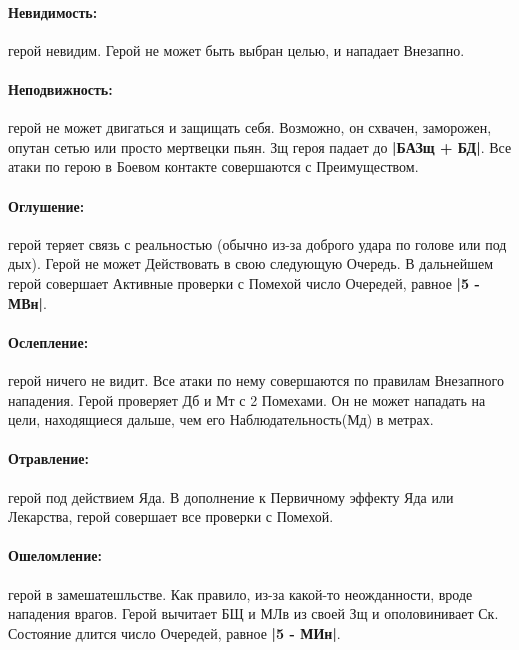\paragraph{Невидимость:} герой невидим. Герой не может быть выбран целью, и нападает Внезапно.
\paragraph{Неподвижность:} герой не может двигаться и защищать себя. Возможно, он схвачен, заморожен, опутан сетью или просто мертвецки пьян. Зщ героя падает до \textbf{|БАЗщ + БД|}. Все атаки по герою в Боевом контакте совершаются с Преимуществом. 
\paragraph{Оглушение:} герой теряет связь с реальностью (обычно из-за доброго удара по голове или под дых). Герой не может Действовать в свою следующую Очередь. В дальнейшем герой совершает Активные проверки с Помехой число Очередей, равное \textbf{|5 - МВн|}.
\paragraph{Ослепление:} герой ничего не видит. Все атаки по нему совершаются по правилам Внезапного нападения. Герой проверяет Дб и Мт с 2 Помехами. Он не может нападать на цели, находящиеся дальше, чем его Наблюдательность(Мд) в метрах.
\paragraph{Отравление:} герой под действием Яда. В дополнение к Первичному эффекту Яда или Лекарства, герой совершает все проверки с Помехой.
\paragraph{Ошеломление:} герой в замешатешльстве. Как правило, из-за какой-то неожданности, вроде нападения врагов. Герой вычитает БЩ и МЛв из своей Зщ и ополовинивает Ск. Состояние длится число Очередей, равное \textbf{|5 - МИн|}.

